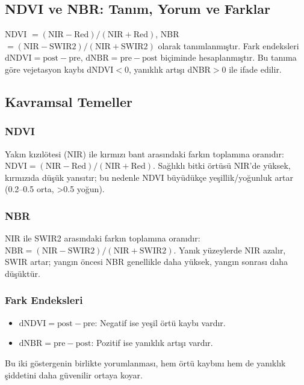 \documentclass[11pt,a4paper]{article}
\begin{document}
\subsection{NDVI ve NBR: Tanım, Yorum ve Farklar}
NDVI $=(\mathrm{NIR}-\mathrm{Red})/(\mathrm{NIR}+\mathrm{Red})$, NBR $=(\mathrm{NIR}-\mathrm{SWIR2})/(\mathrm{NIR}+\mathrm{SWIR2})$ olarak tanımlanmıştır. Fark endeksleri \(\mathrm{dNDVI}=\mathrm{post}-\mathrm{pre}\), \(\mathrm{dNBR}=\mathrm{pre}-\mathrm{post}\) biçiminde hesaplanmıştır. Bu tanıma göre vejetasyon kaybı dNDVI$<0$, yanıklık artışı dNBR$>0$ ile ifade edilir.

\subsection{Kavramsal Temeller}
\subsubsection{NDVI}
Yakın kızılötesi (NIR) ile kırmızı bant arasındaki farkın toplamına oranıdır:\,\(\mathrm{NDVI}=(\mathrm{NIR}-\mathrm{Red})/(\mathrm{NIR}+\mathrm{Red})\). Sağlıklı bitki örtüsü NIR'de yüksek, kırmızıda düşük yansıtır; bu nedenle NDVI büyüdükçe yeşillik/yoğunluk artar (0.2--0.5 orta, >0.5 yoğun).

\subsubsection{NBR}
NIR ile SWIR2 arasındaki farkın toplamına oranıdır:\,\(\mathrm{NBR}=(\mathrm{NIR}-\mathrm{SWIR2})/(\mathrm{NIR}+\mathrm{SWIR2})\). Yanık yüzeylerde NIR azalır, SWIR artar; yangın öncesi NBR genellikle daha yüksek, yangın sonrası daha düşüktür.

\subsubsection{Fark Endeksleri}
\begin{itemize}
  \item \(\mathrm{dNDVI}=\mathrm{post}-\mathrm{pre}\): Negatif ise yeşil örtü kaybı vardır.
  \item \(\mathrm{dNBR}=\mathrm{pre}-\mathrm{post}\): Pozitif ise yanıklık artışı vardır.
\end{itemize}
Bu iki göstergenin birlikte yorumlanması, hem örtü kaybını hem de yanıklık şiddetini daha güvenilir ortaya koyar.
\end{document}
